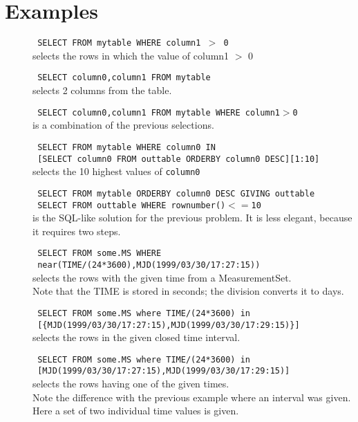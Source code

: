 \section{Examples}
\begin{description}
  \item[] \texttt{ SELECT FROM mytable WHERE column1 $>$ 0 }
    \\selects the rows in which the value of column1 $>$ 0

  \item[] \texttt{ SELECT column0,column1 FROM mytable }
    \\selects 2 columns from the table.

  \item[] \texttt{ SELECT column0,column1 FROM mytable WHERE column1$>$0 }
    \\is a combination of the previous selections.

  \item[] \texttt{ SELECT FROM mytable WHERE column0 IN }
    \\\texttt{ [SELECT column0 FROM outtable ORDERBY column0 DESC][1:10] }
    \\selects the 10 highest values of \texttt{column0}

  \item[] \texttt{ SELECT FROM mytable ORDERBY column0 DESC GIVING outtable }
    \\\texttt{ SELECT FROM outtable WHERE rownumber()$<=$10 }
    \\is the SQL-like solution for the previous problem.
    It is less elegant, because it requires two steps.

  \item[] \texttt{ SELECT FROM some.MS WHERE }
    \\\texttt{ near(TIME/(24*3600),MJD(1999/03/30/17:27:15)) }
    \\selects the rows with the given time from a MeasurementSet.
    \\Note that the TIME is stored in seconds; the division converts
        it to days.

   \item[] \texttt{ SELECT FROM some.MS where TIME/(24*3600) in }
     \\\texttt{ [\{MJD(1999/03/30/17:27:15),MJD(1999/03/30/17:29:15)\}] }
     \\selects the rows in the given closed time interval.

   \item[] \texttt{ SELECT FROM some.MS where TIME/(24*3600) in }
     \\\texttt{ [MJD(1999/03/30/17:27:15),MJD(1999/03/30/17:29:15)] }
     \\selects the rows having one of the given times.
     \\Note the difference with the previous example where an interval
     was given. Here a set of two individual time values is given.


\end{description}
